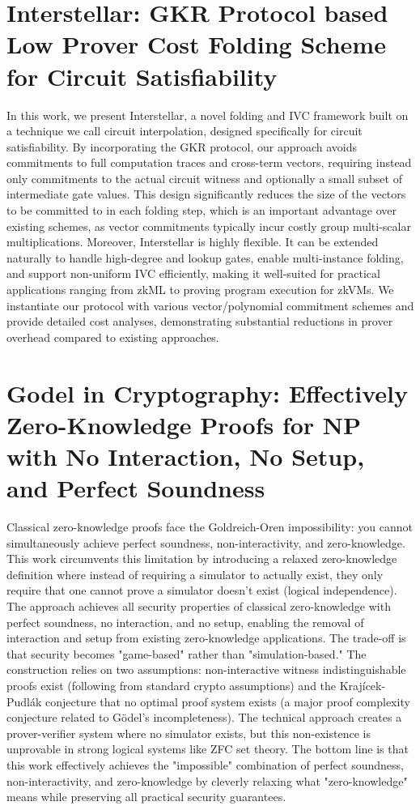 \documentclass[11pt,oneside]{book}
\theoremstyle{definition}
\theoremstyle{remark}
\theoremstyle{plain}
\begin{document}
\section{\cite{Interstellar} Interstellar: GKR Protocol based Low Prover Cost Folding Scheme for Circuit Satisfiability}
In this work, we present Interstellar, a novel folding and IVC framework built on a technique we call circuit interpolation, designed specifically for circuit satisfiability. By incorporating the GKR protocol, our approach avoids commitments to full computation traces and cross-term vectors, requiring instead only commitments to the actual circuit witness and optionally a small subset of intermediate gate values. This design significantly reduces the size of the vectors to be committed to in each folding step, which is an important advantage over existing schemes, as vector commitments typically incur costly group multi-scalar multiplications. Moreover, Interstellar is highly flexible. It can be extended naturally to handle high-degree and lookup gates, enable multi-instance folding, and support non-uniform IVC efficiently, making it well-suited for practical applications ranging from zkML to proving program execution for zkVMs. We instantiate our protocol with various vector/polynomial commitment schemes and provide detailed cost analyses, demonstrating substantial reductions in prover overhead compared to existing approaches.
\section{\cite{Godel} Godel in Cryptography: Effectively Zero-Knowledge Proofs for NP with No Interaction, No Setup, and Perfect Soundness}
Classical zero-knowledge proofs face the Goldreich-Oren impossibility: you cannot simultaneously achieve perfect soundness, non-interactivity, and zero-knowledge. This work circumvents this limitation by introducing a relaxed zero-knowledge definition where instead of requiring a simulator to actually exist, they only require that one cannot prove a simulator doesn't exist (logical independence).
The approach achieves all security properties of classical zero-knowledge with perfect soundness, no interaction, and no setup, enabling the removal of interaction and setup from existing zero-knowledge applications. The trade-off is that security becomes "game-based" rather than "simulation-based."
The construction relies on two assumptions: non-interactive witness indistinguishable proofs exist (following from standard crypto assumptions) and the Krajícek-Pudlák conjecture that no optimal proof system exists (a major proof complexity conjecture related to Gödel's incompleteness). The technical approach creates a prover-verifier system where no simulator exists, but this non-existence is unprovable in strong logical systems like ZFC set theory.
The bottom line is that this work effectively achieves the "impossible" combination of perfect soundness, non-interactivity, and zero-knowledge by cleverly relaxing what "zero-knowledge" means while preserving all practical security guarantees.
\end{document}
